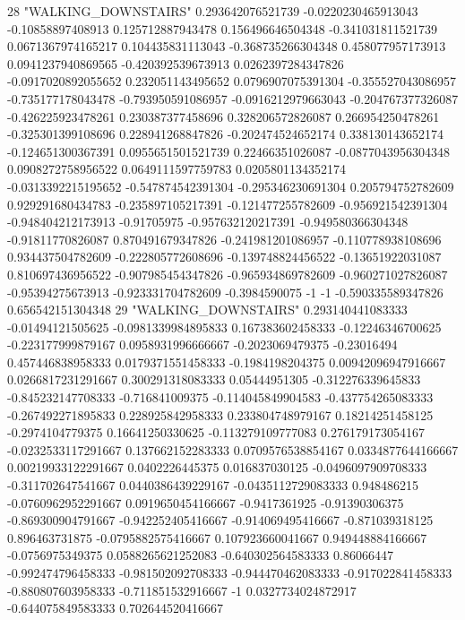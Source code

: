 28 "WALKING_DOWNSTAIRS" 0.293642076521739 -0.0220230465913043 -0.10858897408913 0.125712887943478 0.156496646504348 -0.341031811521739 0.0671367974165217 0.104435831113043 -0.368735266304348 0.458077957173913 0.0941237940869565 -0.420392539673913 0.0262397284347826 -0.0917020892055652 0.232051143495652 0.0796907075391304 -0.355527043086957 -0.735177178043478 -0.793950591086957 -0.0916212979663043 -0.204767377326087 -0.426225923478261 0.230387377458696 0.328206572826087 0.266954250478261 -0.325301399108696 0.228941268847826 -0.202474524652174 0.338130143652174 -0.124651300367391 0.0955651501521739 0.22466351026087 -0.0877043956304348 0.0908272758956522 0.0649111597759783 0.0205801134352174 -0.0313392215195652 -0.547874542391304 -0.295346230691304 0.205794752782609 0.929291680434783 -0.235897105217391 -0.121477255782609 -0.956921542391304 -0.948404212173913 -0.91705975 -0.957632120217391 -0.949580366304348 -0.91811770826087 0.870491679347826 -0.241981201086957 -0.110778938108696 0.934437504782609 -0.222805772608696 -0.139748824456522 -0.13651922031087 0.810697436956522 -0.907985454347826 -0.965934869782609 -0.960271027826087 -0.95394275673913 -0.923331704782609 -0.3984590075 -1 -1 -0.590335589347826 0.656542151304348
29 "WALKING_DOWNSTAIRS" 0.293140441083333 -0.01494121505625 -0.0981339984895833 0.167383602458333 -0.12246346700625 -0.223177999879167 0.0958931996666667 -0.2023069479375 -0.23016494 0.457446838958333 0.0179371551458333 -0.1984198204375 0.00942096947916667 0.0266817231291667 0.300291318083333 0.05444951305 -0.312276339645833 -0.845232147708333 -0.716841009375 -0.114045849904583 -0.437754265083333 -0.267492271895833 0.228925842958333 0.233804748979167 0.18214251458125 -0.2974104779375 0.16641250330625 -0.113279109777083 0.276179173054167 -0.0232533117291667 0.137662152283333 0.0709576538854167 0.0334877644166667 0.00219933122291667 0.0402226445375 0.016837030125 -0.0496097909708333 -0.311702647541667 0.0440386439229167 -0.0435112729083333 0.948486215 -0.0760962952291667 0.0919650454166667 -0.9417361925 -0.91390306375 -0.869300904791667 -0.942252405416667 -0.914069495416667 -0.871039318125 0.896463731875 -0.0795882575416667 0.107923660041667 0.949448884166667 -0.0756975349375 0.0588265621252083 -0.640302564583333 0.86066447 -0.992474796458333 -0.981502092708333 -0.944470462083333 -0.917022841458333 -0.880807603958333 -0.711851532916667 -1 0.0327734024872917 -0.644075849583333 0.702644520416667
